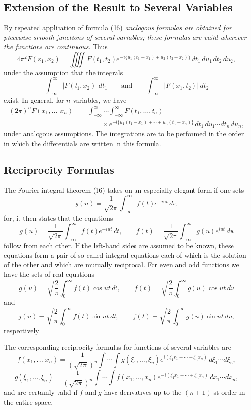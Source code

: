 \subsection{Extension of the Result to Several Variables}
By repeated application of formula (16) \emph{analogous formulas are obtained for piecewise smooth functions of several variables; these formulas are valid wherever the functions are continuous}. Thus
\[
4\pi^2F(x_1,x_2)=\iiiint F(t_1,t_2)
 e^{-i\{u_1(t_1-x_1)+u_2(t_2-x_2)\}}\,dt_1\,du_1\,dt_2\,du_2,
\]
under the assumption that the integrals
\[
\int_{-\infty}^{\infty}|F(t_1,x_2)|\,dt_1
\qquad\text{and}\qquad
\int_{-\infty}^{\infty}|F(x_1,t_2)|\,dt_2
\]
exist. In general, for $n$ variables, we have
\[
\begin{aligned}
(2\pi)^nF(x_1,\ldots,x_n)
={}&\int_{-\infty}^{\infty}\!\cdots\!\int_{-\infty}^{\infty}
F(t_1,\ldots,t_n)\\
&\qquad\times e^{-i\{u_1(t_1-x_1)+\cdots+u_n(t_n-x_n)\}}
\,dt_1\,du_1\cdots dt_n\,du_n,
\end{aligned}
\]
under analogous assumptions. The integrations are to be performed in the order in which the differentials are written in this formula.

\subsection{Reciprocity Formulas}
The Fourier integral theorem (16) takes on an especially elegant form if one sets
\[
g(u)=\frac1{\sqrt{2\pi}}\int_{-\infty}^{\infty}f(t)e^{-iut}\,dt;
\]
for, it then states that the equations
\[
g(u)=\frac1{\sqrt{2\pi}}\int_{-\infty}^{\infty}f(t)e^{-iut}\,dt,
\qquad
f(t)=\frac1{\sqrt{2\pi}}\int_{-\infty}^{\infty}g(u)e^{iut}\,du
\]
follow from each other. If the left-hand sides are assumed to be known, these equations form a pair of so-called integral equations each of which is the solution of the other and which are mutually reciprocal. For even and odd functions we have the sets of real equations
\[
g(u)=\sqrt{\frac2\pi}\int_0^{\infty}f(t)\cos ut\,dt,
\qquad
f(t)=\sqrt{\frac2\pi}\int_0^{\infty}g(u)\cos ut\,du
\]
and
\[
g(u)=\sqrt{\frac2\pi}\int_0^{\infty}f(t)\sin ut\,dt,
\qquad
f(t)=\sqrt{\frac2\pi}\int_0^{\infty}g(u)\sin ut\,du,
\]
respectively.

The corresponding reciprocity formulas for functions of several variables are
\[
f(x_1,\ldots,x_n)
=\frac1{(\sqrt{2\pi})^n}\int\cdots\int
 g(\xi_1,\ldots,\xi_n)e^{i(\xi_1x_1+\cdots+\xi_nx_n)}
\,d\xi_1\cdots d\xi_n,
\]
\[
g(\xi_1,\ldots,\xi_n)
=\frac1{(\sqrt{2\pi})^n}\int\cdots\int
 f(x_1,\ldots,x_n)e^{-i(\xi_1x_1+\cdots+\xi_nx_n)}
\,dx_1\cdots dx_n,
\]
and are certainly valid if $f$ and $g$ have derivatives up to the $(n+1)$-st order in the entire space.

